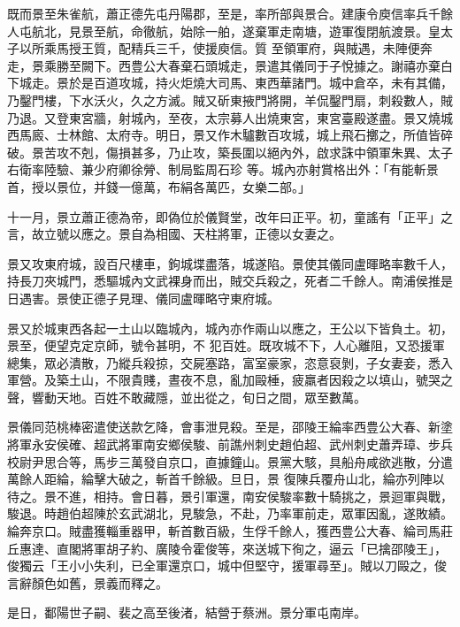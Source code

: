 \begin{pinyinscope}
 既而景至朱雀航，蕭正德先屯丹陽郡，至是，率所部與景合。建康令庾信率兵千餘人屯航北，見景至航，命徹航，始除一舶，遂棄軍走南塘，遊軍復閉航渡景。皇太子以所乘馬授王質，配精兵三千，使援庾信。質
 至領軍府，與賊遇，未陣便奔走，景乘勝至闕下。西豊公大春棄石頭城走，景遣其儀同于子悅據之。謝禧亦棄白下城走。景於是百道攻城，持火炬燒大司馬、東西華諸門。城中倉卒，未有其備，乃鑿門樓，下水沃火，久之方滅。賊又斫東掖門將開，羊侃鑿門扇，刺殺數人，賊乃退。又登東宮牆，射城內，至夜，太宗募人出燒東宮，東宮臺殿遂盡。景又燒城西馬廄、士林館、太府寺。明日，景又作木驢數百攻城，城上飛石擲之，所值皆碎破。景苦攻不剋，傷損甚多，乃止攻，築長圍以絕內外，啟求誅中領軍朱異、太子右衛率陸驗、兼少府卿徐膋、制局監周石珍
 等。城內亦射賞格出外：「有能斬景首，授以景位，并錢一億萬，布絹各萬匹，女樂二部。」



 十一月，景立蕭正德為帝，即偽位於儀賢堂，改年曰正平。初，童謠有「正平」之言，故立號以應之。景自為相國、天柱將軍，正德以女妻之。



 景又攻東府城，設百尺樓車，鉤城堞盡落，城遂陷。景使其儀同盧暉略率數千人，持長刀夾城門，悉驅城內文武裸身而出，賊交兵殺之，死者二千餘人。南浦侯推是日遇害。景使正德子見理、儀同盧暉略守東府城。



 景又於城東西各起一土山以臨城內，城內亦作兩山以應之，王公以下皆負土。初，景至，便望克定京師，號令甚明，不
 犯百姓。既攻城不下，人心離阻，又恐援軍總集，眾必潰散，乃縱兵殺掠，交屍塞路，富室豪家，恣意裒剝，子女妻妾，悉入軍營。及築土山，不限貴賤，晝夜不息，亂加毆棰，疲羸者因殺之以填山，號哭之聲，響動天地。百姓不敢藏隱，並出從之，旬日之間，眾至數萬。



 景儀同范桃棒密遣使送款乞降，會事泄見殺。至是，邵陵王綸率西豊公大春、新塗將軍永安侯確、超武將軍南安鄉侯駿、前譙州刺史趙伯超、武州刺史蕭弄璋、步兵校尉尹思合等，馬步三萬發自京口，直據鐘山。景黨大駭，具船舟咸欲逃散，分遣萬餘人距綸，綸擊大破之，斬首千餘級。旦日，景
 復陳兵覆舟山北，綸亦列陣以待之。景不進，相持。會日暮，景引軍還，南安侯駿率數十騎挑之，景迴軍與戰，駿退。時趙伯超陳於玄武湖北，見駿急，不赴，乃率軍前走，眾軍因亂，遂敗績。綸奔京口。賊盡獲輜重器甲，斬首數百級，生俘千餘人，獲西豊公大春、綸司馬莊丘惠達、直閣將軍胡子約、廣陵令霍俊等，來送城下徇之，逼云「已擒邵陵王」，俊獨云「王小小失利，已全軍還京口，城中但堅守，援軍尋至」。賊以刀毆之，俊言辭顏色如舊，景義而釋之。



 是日，鄱陽世子嗣、裴之高至後渚，結營于蔡洲。景分軍屯南岸。




\end{pinyinscope}
